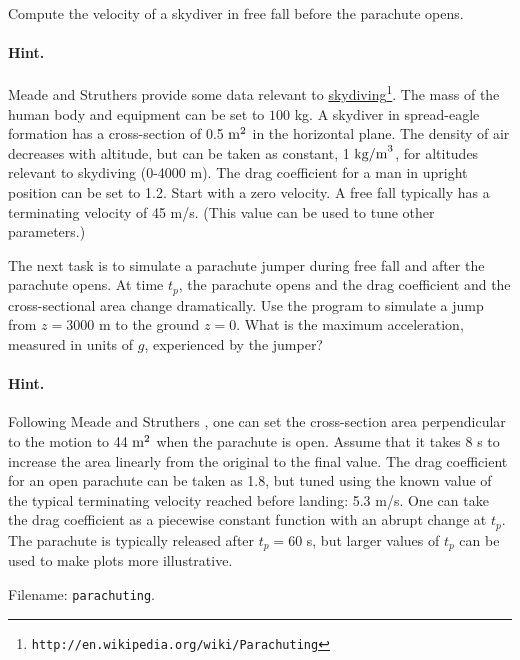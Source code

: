 \documentclass[graybox,sectrefs,envcountresetchap,open=right,final]{svmonodo}
\newenvironment{doconceexercise}{}{}
\begin{document}
\begin{doconceexercise}

Compute the velocity of
a skydiver in free fall before the parachute opens.


\paragraph{Hint.}
Meade and Struthers \cite{parachute_1999} provide some data relevant
to \href{{http://en.wikipedia.org/wiki/Parachuting}}{skydiving}\footnote{\texttt{http://en.wikipedia.org/wiki/Parachuting}}.
The mass of the human body and equipment
can be set to $100$ kg.
A skydiver in spread-eagle formation has a cross-section of 0.5 $\hbox{m}^2$
in the horizontal plane.
The density of air decreases with altitude, but can be taken
as constant, 1 $\hbox{kg/m}^3$, for altitudes relevant to
skydiving (0-4000 m).
The drag coefficient for a man in upright position can be set to 1.2.
Start with a zero velocity.
A free fall typically has a terminating velocity of 45 m/s. (This value
can be used to tune other parameters.)


The next task is to simulate
a parachute jumper during free fall and after the parachute opens.
At time $t_p$, the parachute opens and
the drag coefficient and the cross-sectional
area change dramatically.
Use the program to simulate a jump from $z=3000$ m to the ground $z=0$.
What is the maximum acceleration, measured in units of $g$,
experienced by the jumper?


\paragraph{Hint.}
Following Meade and Struthers \cite{parachute_1999}, one can set the
cross-section area perpendicular to the motion to 44 $\hbox{m}^2$
when the parachute is open. Assume that it takes 8 s to increase
the area linearly from the original to the final value.
The drag coefficient for an open
parachute can be taken as 1.8, but tuned using the known value
of the typical terminating velocity reached before landing:
5.3 m/s. One can take the drag coefficient as a piecewise constant
function with an abrupt change at $t_p$.
The parachute is typically released after $t_p=60$ s, but
larger values of $t_p$ can be used to make plots more illustrative.


\noindent Filename: \texttt{parachuting}.

\end{doconceexercise}
\end{document}
